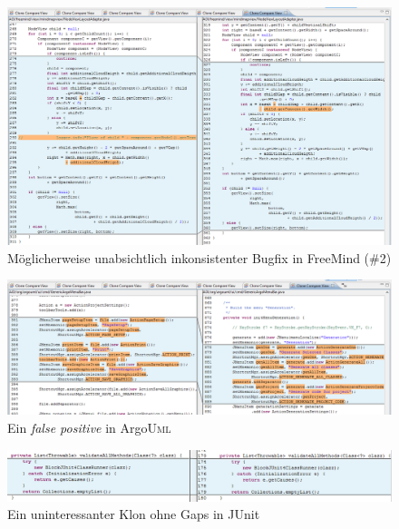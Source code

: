 \begin{figure}[h!]
  \centering
  \includegraphics[width=\textwidth]{imgs/clone_examples/additional_cloud_height_bug.PNG}
  \caption{Möglicherweise unabsichtlich inkonsistenter Bugfix in FreeMind (\#2)}
\end{figure}


\begin{figure}[h!]
  \centering
  \includegraphics[width=\textwidth]{imgs/clone_examples/false_positive_ui_boilerplate.PNG}
  \caption{Ein \textit{false positive} in Argo\textsc{Uml}}
\end{figure}


\begin{figure}[h!]
  \centering
  \includegraphics[width=\textwidth]{imgs/clone_examples/junit_uninteresting.PNG}
  \caption{Ein uninteressanter Klon ohne Gaps in JUnit}
\end{figure}


